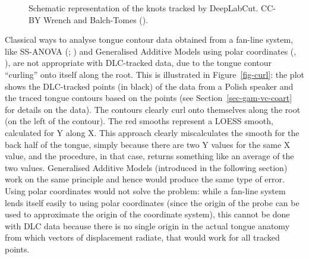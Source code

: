 \documentclass[
  man,
  longtable,
  nolmodern,
  notxfonts,
  notimes,
  colorlinks=true,linkcolor=blue,citecolor=blue,urlcolor=blue]{apa7}
\begin{document}
\begin{figure}

\caption{\label{fig-knots}Schematic representation of the knots tracked
by DeepLabCut. CC-BY Wrench and Balch-Tomes
().}


\end{figure}%

Classical ways to analyse tongue contour data obtained from a fan-line
system, like SS-ANOVA (;
) and Generalised Additive
Models using polar coordinates (, ), are not appropriate with
DLC-tracked data, due to the tongue contour ``curling'' onto itself
along the root. This is illustrated in Figure~\ref{fig-curl}: the plot
shows the DLC-tracked points (in black) of the data from a Polish
speaker and the traced tongue contours based on the points (see
Section~\ref{sec-gam-vc-coart} for details on the data). The contours
clearly curl onto themselves along the root (on the left of the
contour). The red smooths represent a LOESS smooth, calculated for Y
along X. This approach clearly miscalculates the smooth for the back
half of the tongue, simply because there are two Y values for the same X
value, and the procedure, in that case, returns something like an
average of the two values. Generalised Additive Models (introduced in
the following section) work on the same principle and hence would
produce the same type of error. Using polar coordinates would not solve
the problem: while a fan-line system lends itself easily to using polar
coordinates (since the origin of the probe can be used to approximate
the origin of the coordinate system), this cannot be done with DLC data
because there is no single origin in the actual tongue anatomy from
which vectors of displacement radiate, that would work for all tracked
points.
\end{document}
